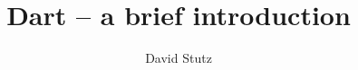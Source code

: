 \documentclass{article}
\begin{document}
\title{Dart -- a brief introduction}
\author{David Stutz}



\newpage

\tableofcontents

\lstlistoflistings

\listoffigures

\newpage



\newpage



\newpage



\newpage



\newpage



\newpage



\newpage



\newpage


\end{document}
